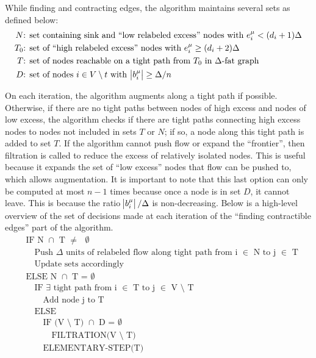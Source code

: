\documentclass[11pt]{article}
\theoremstyle{definition}
\theoremstyle{definition}
\begin{document}
	While finding and contracting edges, the algorithm maintains several sets as defined below:
	\begin{align*}
	N&\text{: set containing sink and ``low relabeled excess'' nodes with } e_i^\mu < (d_i +1)\Delta \\
	T_0&\text{: set of ``high relabeled excess'' nodes with } e_i^\mu \geq (d_i + 2)\Delta \\
	T&\text{: set of nodes reachable on a tight path from $T_0$ in $\Delta$-fat graph} \\ 
	D&\text{: set of nodes $i \in V \setminus t$ with } \abs{b_i^\mu} \geq \Delta / n
	\end{align*}
	
	On each iteration, the algorithm augments along a tight path if possible. Otherwise, if there
    are no tight paths between nodes of high excess and nodes of low excess, the algorithm checks
    if there are tight paths connecting high excess nodes to nodes not included in sets $T$ or $N$;
    if so, a node along this tight path is added to set $T$. If the algorithm cannot push flow
    or expand the ``frontier'', then filtration is called to reduce the excess of relatively
    isolated nodes. This is useful because it expands the set of ``low excess'' nodes that flow
    can be pushed to, which allows augmentation. It is important to note that this last option
    can only be computed at most $n - 1$ times because once a node is in set $D$, it cannot leave.
    This is because the ratio $\abs{b_i^\mu} / \Delta$ is non-decreasing. Below is a high-level
    overview of the set of decisions made at each iteration of the ``finding contractible edges''
    part of the algorithm.
	\begin{align*}
	&\text{IF N $\cap$ T $\neq$ $\emptyset$} \\
	&\quad \text{Push $\Delta$ units of relabeled flow along tight path from i $\in$ N to j $\in$ T} \\ 
	&\quad \text{Update sets accordingly} \\
	&\text{ELSE N $\cap$ T = $\emptyset$} \\
	&\quad \text{IF $\exists$ tight path from i $\in$ T to j $\in$ V $\setminus$ T} \\
	&\quad \quad \text{Add node j to T} \\
	&\quad \text{ELSE} \\
	&\quad \quad \text{IF (V $\setminus$ T) $\cap$ D = $\emptyset$} \\
	&\quad \quad \quad \text{FILTRATION(V $\setminus$ T)} \\
	&\quad \quad \text{ELEMENTARY-STEP(T)} 
	\end{align*}
	
\end{document}
